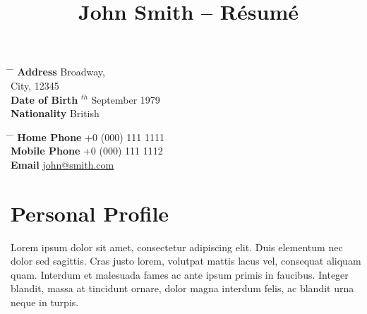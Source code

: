 %
%
%
%

\title{John Smith -- Résumé} %


\parbox{0.5\textwidth}{ %
\begin{tabbing} %
\hspace{3cm} \= \hspace{4cm} \= \kill %
{\bf Address}  Broadway,\\ %
\> City, 12345 \\ %
{\bf Date of Birth} $^{th}$ September 1979 \\ %
{\bf Nationality} \> British %
\end{tabbing}}
\hfill %
\parbox{0.5\textwidth}{ %
\begin{tabbing} %
\hspace{3cm} \= \hspace{4cm} \= \kill %
{\bf Home Phone} \> +0 (000) 111 1111 \\ %
{\bf Mobile Phone} \> +0 (000) 111 1112 \\ %
{\bf Email} \> \href{mailto:john@smith.com}{john@smith.com} \\ %
\end{tabbing}}


\section{Personal Profile}

Lorem ipsum dolor sit amet, consectetur adipiscing elit. Duis elementum nec dolor sed sagittis. Cras justo lorem, volutpat mattis lacus vel, consequat aliquam quam. Interdum et malesuada fames ac ante ipsum primis in faucibus. Integer blandit, massa at tincidunt ornare, dolor magna interdum felis, ac blandit urna neque in turpis.

